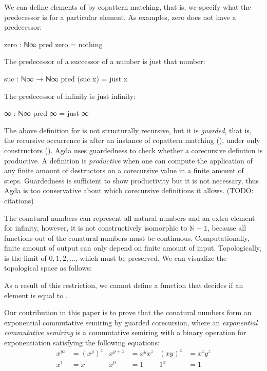 We can define elements of  by copattern matching, that is, we
specify what the predecessor is for a particular element. As examples, zero does
not have a predecessor:
\begin{code}
zero : ℕ∞
pred zero = nothing
\end{code}
The predecessor of a successor of a number is just that number:
\begin{code}
suc : ℕ∞ → ℕ∞
pred (suc x) = just x
\end{code}
The predecessor of infinity is just infinity:
\begin{code}
∞ : ℕ∞
pred ∞ = just ∞
\end{code}
The above definition for  is not structurally recursive, but it
is \emph{guarded}, that is, the recursive occurrence is after an instance of
copattern matching (), under only constructors
(). Agda uses guardedness to check whether a
corecursive defintion is productive. A definition is \emph{productive} when one
can compute the application of any finite amount of destructors on a corecursive
value in a finite amount of steps. Guardedness is sufficient to show
productivity but it is not necessary, thus Agda is too conservative about which
corecursive definitions it allows. (TODO: citations)

The conatural numbers can represent all natural numbers and an extra element for
infinity, however, it is not constructively isomorphic to $\mathbb{N} +
\mathbb{1}$, because all functions out of the conatural numbers must be
continuous. Computationally, finite amount of output can only depend on finite
amount of input. Topologically,  is the limit of $0, 1, 2,
\dots$, which must be preserved. We can visualize the topological space as
follows:
\begin{center}
\end{center}
As a result of this restriction, we cannot define a function that decides if an
element is equal to .

Our contribution in this paper is to prove that the conatural numbers form an
exponential commutative semiring by guarded corecursion, where an
\emph{exponential commutative semiring} is a commutative semiring with a binary
operation for exponentiation satisfying the following equations:
\begin{align*}
  x^{yz} &= (x^y)^z & x^{y+z} &= x^y x^z & (xy)^z &= x^z y^z \\
  x^1 &= x & x^0 &= 1 & 1^x &= 1
\end{align*}

